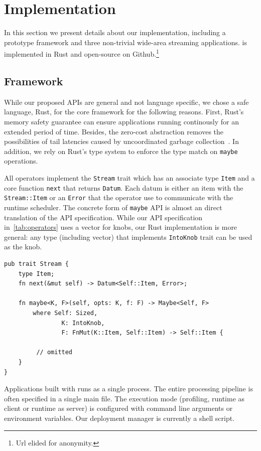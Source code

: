 \section{Implementation}
\label{sec:implementation}

In this section we present details about our implementation, including a
prototype framework and three non-trivial wide-area streaming applications.
\sysname{} is implemented in Rust and open-source on Github.\footnote{Url elided
  for anonymity.}

\subsection{Framework}
\label{sec:framework}

While our proposed APIs are general and not language specific, we chose a safe
language, Rust, for the core framework for the following reasons. First, Rust's
memory safety guarantee can ensure applications running continously for an
extended period of time. Besides, the zero-cost abstraction removes the
possibilities of tail latencies caused by uncoordinated garbage
collection~\cite{maas2016taurus}. In addition, we rely on Rust's type system to
enforce the type match on \texttt{maybe} operations.

All operators implement the \texttt{Stream} trait which has an associate type
\texttt{Item} and a core function \texttt{next} that returns
\texttt{Datum}. Each datum is either an item with the \texttt{Stream::Item} or
an \texttt{Error} that the operator use to communicate with the runtime
scheduler. The concrete form of \texttt{maybe} API is almost an direct
translation of the API specification. While our API specification
in~\autoref{tab:operators} uses a vector for knobs, our Rust implementation is
more general: any type (including vector) that implements \texttt{IntoKnob}
trait can be used as the knob.

\begin{lstlisting}
pub trait Stream {
    type Item;
    fn next(&mut self) -> Datum<Self::Item, Error>;

    fn maybe<K, F>(self, opts: K, f: F) -> Maybe<Self, F>
        where Self: Sized,
                K: IntoKnob,
                F: FnMut(K::Item, Self::Item) -> Self::Item {

         // omitted
    }
}
\end{lstlisting}

Applications built with \sysname{} runs as a single process. The entire
processing pipeline is often specified in a single main file. The execution mode
(profiling, runtime as client or runtime as server) is configured with command
line arguments or environment variables. Our deployment manager is currently a
shell script.

